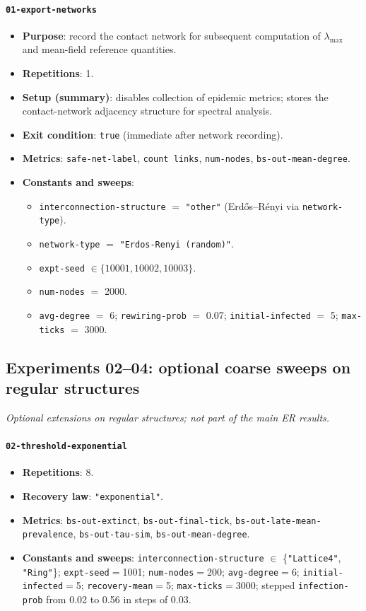 \documentclass[11pt,a4paper]{article}
\begin{document}
\paragraph{\texttt{01-export-networks}}
\begin{itemize}[leftmargin=*]
  \item \textbf{Purpose}: record the contact network for subsequent computation of $\lambda_{\max}$ and mean-field reference quantities.
  \item \textbf{Repetitions}: 1.
  \item \textbf{Setup (summary)}: disables collection of epidemic metrics; stores the contact-network adjacency structure for spectral analysis.
  \item \textbf{Exit condition}: \texttt{true} (immediate after network recording).
  \item \textbf{Metrics}: \texttt{safe-net-label}, \texttt{count links}, \texttt{num-nodes}, \texttt{bs-out-mean-degree}.
  \item \textbf{Constants and sweeps}:
  \begin{itemize}[leftmargin=*]
    \item \texttt{interconnection-structure} $=$ \texttt{"other"} (Erd\H{o}s--R\'enyi via \texttt{network-type}).
    \item \texttt{network-type} $=$ \texttt{"Erdos-Renyi (random)"}.
    \item \texttt{expt-seed} $\in\{10001,10002,10003\}$.
    \item \texttt{num-nodes} $=$ 2000.
    \item \texttt{avg-degree} $=$ 6; \texttt{rewiring-prob} $=$ 0.07; \texttt{initial-infected} $=$ 5; \texttt{max-ticks} $=$ 3000.
  \end{itemize}
\end{itemize}

\subsection{Experiments 02--04: optional coarse sweeps on regular structures}
\textit{Optional extensions on regular structures; not part of the main ER results.}
\paragraph{\texttt{02-threshold-exponential}}
\begin{itemize}[leftmargin=*]
  \item \textbf{Repetitions}: 8.
  \item \textbf{Recovery law}: \texttt{"exponential"}.
  \item \textbf{Metrics}: \texttt{bs-out-extinct}, \texttt{bs-out-final-tick}, \texttt{bs-out-late-mean-prevalence}, \texttt{bs-out-tau-sim}, \texttt{bs-out-mean-degree}.
  \item \textbf{Constants and sweeps}: \texttt{interconnection-structure} $\in$ \{\texttt{"Lattice4"}, \texttt{"Ring"}\}; \texttt{expt-seed}$=$1001; \texttt{num-nodes}$=$200; \texttt{avg-degree}$=$6; \texttt{initial-infected}$=$5; \texttt{recovery-mean}$=$5; \texttt{max-ticks}$=$3000; stepped \texttt{infection-prob} from 0.02 to 0.56 in steps of 0.03.
\end{itemize}
\end{document}
